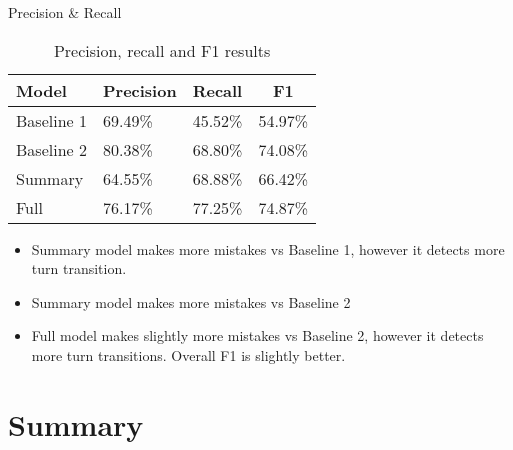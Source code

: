\documentclass[t]{beamer}
\begin{document}
\begin{frame}{Precision \& Recall}

\begin{table}
   \begin{center}
    \begin{tabular}{|l|l|l|c|}
    \hline
    Model & Precision & Recall & F1\\
    \hline
    Baseline 1               &69.49\% &45.52\%&54.97\%\\
    Baseline 2               &80.38\% &68.80\%&74.08\%\\
    Summary                  &64.55\% &68.88\%&66.42\%\\
    Full                     &76.17\% &77.25\%&74.87\%\\
  \hline
\end{tabular}
\end{center}
\caption{Precision, recall and F1 results }
\end{table}
\begin{itemize}
    \item Summary model makes more mistakes vs Baseline 1, however it detects more turn transition.
    \item Summary model makes more mistakes vs Baseline 2
    \item Full model makes slightly more mistakes vs Baseline 2, however it detects more turn transitions. Overall F1 is slightly better.
\end{itemize}
\end{frame}




\section{Summary}

\end{document}
